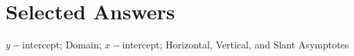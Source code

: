 \documentclass[12pt]{book}
\theoremstyle{definition}
\begin{document}
\section{Selected Answers}
$y-$intercept; Domain; $x-$intercept; Horizontal, Vertical, and Slant Asymptotes
\end{document}
